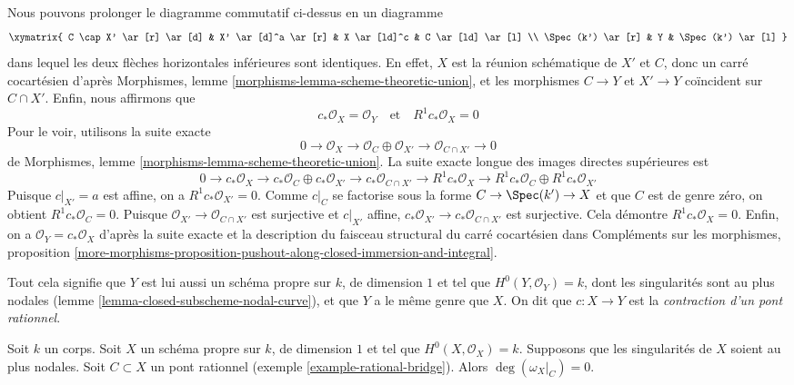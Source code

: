 \begin{example}
\medskip\noindent
Nous pouvons prolonger le diagramme commutatif ci-dessus en un diagramme $$
\xymatrix{
C \cap X' \ar[r] \ar[d] &
X' \ar[d]^a \ar[r] & X \ar[ld]^c &
C \ar[ld] \ar[l] \\
\Spec(k') \ar[r] &
Y &
\Spec(k') \ar[l]
}
$$ dans lequel les deux flèches horizontales inférieures sont identiques. En effet, $X$ est la réunion schématique de $X'$ et $C$, donc un carré cocartésien d'après Morphismes, lemme \ref{morphisms-lemma-scheme-theoretic-union}, et les morphismes $C \to Y$ et $X' \to Y$ coïncident sur $C \cap X'$. Enfin, nous affirmons que $$
c_*\mathcal{O}_X = \mathcal{O}_Y
\quad\text{et}\quad
R^1c_*\mathcal{O}_X = 0
$$ Pour le voir, utilisons la suite exacte $$
0 \to \mathcal{O}_X \to
\mathcal{O}_C \oplus \mathcal{O}_{X'} \to
\mathcal{O}_{C \cap X'} \to 0
$$ de Morphismes, lemme \ref{morphisms-lemma-scheme-theoretic-union}. La suite exacte longue des images directes supérieures est $$
0 \to c_*\mathcal{O}_X \to c_*\mathcal{O}_C \oplus c_*\mathcal{O}_{X'} \to
c_*\mathcal{O}_{C \cap X'} \to
R^1c_*\mathcal{O}_X \to
R^1c_*\mathcal{O}_C \oplus R^1c_*\mathcal{O}_{X'}
$$ Puisque $c|_{X'} = a$ est affine, on a $R^1c_*\mathcal{O}_{X'} = 0$. Comme $c|_C$ se factorise sous la forme $C \to \Spec(k') \to X$ et que $C$ est de genre zéro, on obtient $R^1c_*\mathcal{O}_C = 0$. Puisque $\mathcal{O}_{X'} \to \mathcal{O}_{C \cap X'}$ est surjective et $c|_{X'}$ affine, $c_*\mathcal{O}_{X'} \to c_*\mathcal{O}_{C \cap X'}$ est surjective. Cela démontre $R^1c_*\mathcal{O}_X = 0$. Enfin, on a $\mathcal{O}_Y = c_*\mathcal{O}_X$ d'après la suite exacte et la description du faisceau structural du carré cocartésien dans Compléments sur les morphismes, proposition \ref{more-morphisms-proposition-pushout-along-closed-immersion-and-integral}.

\medskip\noindent
Tout cela signifie que $Y$ est lui aussi un schéma propre sur $k$, de dimension $1$ et tel que $H^0(Y, \mathcal{O}_Y) = k$, dont les singularités sont au plus nodales (lemme \ref{lemma-closed-subscheme-nodal-curve}), et que $Y$ a le même genre que $X$. On dit que $c : X \to Y$ est la {\it contraction d'un pont rationnel}.
\end{example}

\begin{lemma}
\label{lemma-rational-bridge-zero}
Soit $k$ un corps. Soit $X$ un schéma propre sur $k$, de dimension $1$ et tel que $H^0(X, \mathcal{O}_X) = k$. Supposons que les singularités de $X$ soient au plus nodales. Soit $C \subset X$ un pont rationnel (exemple \ref{example-rational-bridge}). Alors $\deg(\omega_X|_C) = 0$.
\end{lemma}

